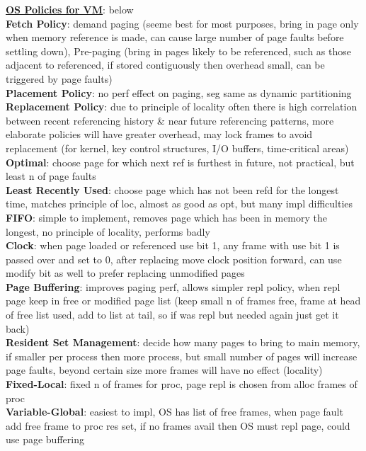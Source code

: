 \documentclass[a4paper]{article}
\begin{document}
\begin{multicols}{2}
        \underline{\textbf{OS Policies for VM}}: below\\
        \textbf{Fetch Policy}: demand paging (seeme best for most purposes, bring in page only when memory reference is made, can cause large number of page faults before settling down), Pre-paging (bring in pages likely to be referenced, such as those adjacent to referenced, if stored contiguously then overhead small, can be triggered by page faults)\\
        \textbf{Placement Policy}: no perf effect on paging, seg same as dynamic partitioning\\
        \textbf{Replacement Policy}: due to principle of locality often there is high correlation between recent referencing history \& near future referencing patterns, more elaborate policies will have greater overhead, may lock frames to avoid replacement (for kernel, key control structures, I/O buffers, time-critical areas)\\
        \textbf{Optimal}: choose page for which next ref is furthest in future, not practical, but least n of page faults\\
        \textbf{Least Recently Used}: choose page which has not been refd for the longest time, matches principle of loc, almost as good as opt, but many impl difficulties\\
        \textbf{FIFO}: simple to implement, removes page which has been in memory the longest, no principle of locality, performs badly\\
        \textbf{Clock}: when page loaded or referenced use bit 1, any frame with use bit 1 is passed over and set to 0, after replacing move clock position forward, can use modify bit as well to prefer replacing unmodified pages\\
        \textbf{Page Buffering}: improves paging perf, allows simpler repl policy, when repl page keep in free or modified page list (keep small n of frames free, frame at head of free list used, add to list at tail, so if was repl but needed again just get it back)\\
        \textbf{Resident Set Management}: decide how many pages to bring to main memory, if smaller per process then more process, but small number of pages will increase page faults, beyond certain size more frames will have no effect (locality)\\
        \textbf{Fixed-Local}: fixed n of frames for proc, page repl is chosen from alloc frames of proc\\
        \textbf{Variable-Global}: easiest to impl, OS has list of free frames, when page fault add free frame to proc res set, if no frames avail then OS must repl page, could use page buffering\\

\end{multicols}
\end{document}
